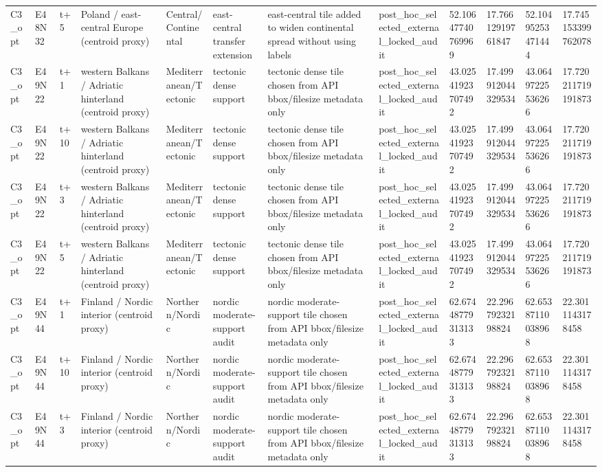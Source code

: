 \begin{landscape}
\begin{longtable}{llllllllllll}
C3\_opt & E48N32 & t+5 & Poland / east-central Europe (centroid proxy) & Central/Continental & east-central transfer extension & east-central tile added to widen continental spread without using labels & post\_hoc\_selected\_external\_locked\_audit & 52.10647740769969 & 17.76612919761847 & 52.10495253471444 & 17.745153399762078 \\
C3\_opt & E49N22 & t+1 & western Balkans / Adriatic hinterland (centroid proxy) & Mediterranean/Tectonic & tectonic dense support & tectonic dense tile chosen from API bbox/filesize metadata only & post\_hoc\_selected\_external\_locked\_audit & 43.02541923707492 & 17.499912044329534 & 43.06497225536266 & 17.720211719191873 \\
C3\_opt & E49N22 & t+10 & western Balkans / Adriatic hinterland (centroid proxy) & Mediterranean/Tectonic & tectonic dense support & tectonic dense tile chosen from API bbox/filesize metadata only & post\_hoc\_selected\_external\_locked\_audit & 43.02541923707492 & 17.499912044329534 & 43.06497225536266 & 17.720211719191873 \\
C3\_opt & E49N22 & t+3 & western Balkans / Adriatic hinterland (centroid proxy) & Mediterranean/Tectonic & tectonic dense support & tectonic dense tile chosen from API bbox/filesize metadata only & post\_hoc\_selected\_external\_locked\_audit & 43.02541923707492 & 17.499912044329534 & 43.06497225536266 & 17.720211719191873 \\
C3\_opt & E49N22 & t+5 & western Balkans / Adriatic hinterland (centroid proxy) & Mediterranean/Tectonic & tectonic dense support & tectonic dense tile chosen from API bbox/filesize metadata only & post\_hoc\_selected\_external\_locked\_audit & 43.02541923707492 & 17.499912044329534 & 43.06497225536266 & 17.720211719191873 \\
C3\_opt & E49N44 & t+1 & Finland / Nordic interior (centroid proxy) & Northern/Nordic & nordic moderate-support audit & nordic moderate-support tile chosen from API bbox/filesize metadata only & post\_hoc\_selected\_external\_locked\_audit & 62.67448779313133 & 22.29679232198824 & 62.65387110038968 & 22.3011143178458 \\
C3\_opt & E49N44 & t+10 & Finland / Nordic interior (centroid proxy) & Northern/Nordic & nordic moderate-support audit & nordic moderate-support tile chosen from API bbox/filesize metadata only & post\_hoc\_selected\_external\_locked\_audit & 62.67448779313133 & 22.29679232198824 & 62.65387110038968 & 22.3011143178458 \\
C3\_opt & E49N44 & t+3 & Finland / Nordic interior (centroid proxy) & Northern/Nordic & nordic moderate-support audit & nordic moderate-support tile chosen from API bbox/filesize metadata only & post\_hoc\_selected\_external\_locked\_audit & 62.67448779313133 & 22.29679232198824 & 62.65387110038968 & 22.3011143178458 \\

\end{longtable}
\end{landscape}
